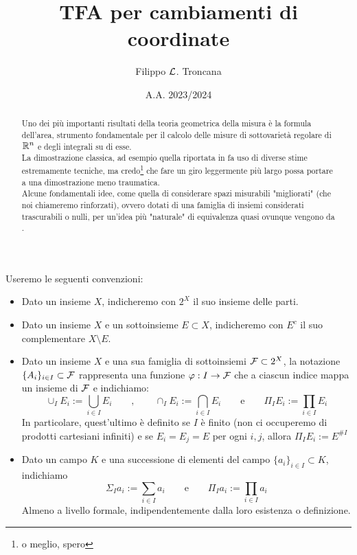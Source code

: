 \documentclass{article}
\title{TFA per cambiamenti di coordinate}
\author{Filippo $\mathcal{L}$. Troncana}
\date{A.A. 2023/2024}
\renewcommand\F{\mc{F}}
\begin{document}
\maketitle

\begin{abstract}
    Uno dei più importanti risultati della teoria geometrica della misura è la formula dell'area, strumento fondamentale per il calcolo delle misure di sottovarietà regolare di $\mathbb{R}^n$ e degli integrali su di esse.\\
    La dimostrazione classica, ad esempio quella riportata in \cite{EvansGariepy1991} fa uso di diverse stime estremamente tecniche, ma credo\footnote{o meglio, spero} che fare un giro leggermente più largo possa portare a una dimostrazione meno traumatica.\\
    Alcune fondamentali idee, come quella di considerare spazi misurabili "migliorati" (che noi chiameremo rinforzati), ovvero dotati di una famiglia di insiemi considerati trascurabili o nulli, per un'idea più "naturale" di equivalenza quasi ovunque vengono da \cite{Fremlin2000}.
\end{abstract}

\tableofcontents

\begin{notation}
    Useremo le seguenti convenzioni:\begin{itemize}
        \item Dato un insieme $X$, indicheremo con $2^X$ il suo insieme delle parti.
        \item Dato un insieme $X$ e un sottoinsieme $E\subset X$, indicheremo con $E^c$ il suo complementare $X\setminus E$.
        \item Dato un insieme $X$ e una sua famiglia di sottoinsiemi $\F \subset 2^X$, la notazione $\{A_i\}_{i \in I} \subset \F$ rappresenta una funzione $\varphi: I \to \F$ che a ciascun indice mappa un insieme di $\F$ e indichiamo:
        \[\cup_I E_i := \bigcup_{i \in I} E_i \qquad, \qquad \cap_I E_i := \bigcap_{i \in I} E_i \qquad \text{e}\qquad \Pi_I E_i := \prod_{i \in I} E_i \]
        In particolare, quest'ultimo è definito se $I$ è finito (non ci occuperemo di prodotti cartesiani infiniti) e se $E_i = E_j= E $ per ogni $i,j$, allora $\Pi_I E_i := E^{\# I}$
        \item Dato un campo $K$ e una successione di elementi del campo $\{a_i\}_{i \in I}\subset K$, indichiamo
        \[\Sigma_I a_i := \sum_{i \in I} a_i \qquad\text{e} \qquad \Pi_I a_i := \prod_{i \in I} a_i \]
        Almeno a livello formale, indipendentemente dalla loro esistenza o definizione.
    \end{itemize}
\end{notation}
\end{document}
